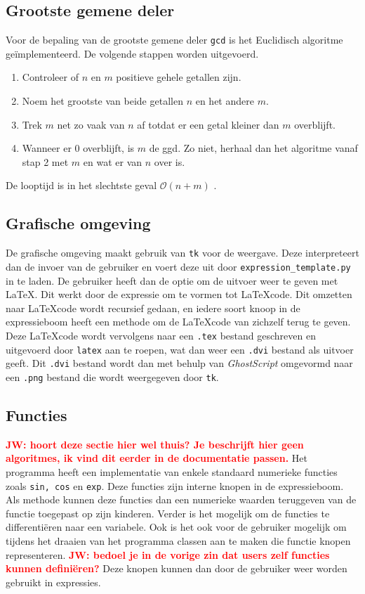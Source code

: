 \documentclass[a4paper]{article}
\newcommand{\rcom}[1]{\textbf{\textcolor{red}{#1}}}
\newcommand{\ttt}[1]{\texttt{#1}}
\begin{document}
\subsection{Grootste gemene deler}
Voor de bepaling van de grootste gemene deler \ttt{gcd} is het Euclidisch algoritme ge\"implementeerd. De volgende stappen worden uitgevoerd.
\begin{enumerate}
\item Controleer of $n$ en $m$ positieve gehele getallen zijn.
\item Noem het grootste van beide getallen $n$ en het andere $m$.
\item Trek $m$ net zo vaak van $n$ af totdat er een getal kleiner dan $m$ overblijft.
\item Wanneer er $0$ overblijft, is $m$ de ggd. Zo niet, herhaal dan het algoritme vanaf stap 2 met $m$ en wat er van $n$ over is.
\end{enumerate}
De looptijd is in het slechtste geval $\mathcal{O}(n+m)$ \cite{gcd}.

\subsection{Grafische omgeving}
De grafische omgeving maakt gebruik van  \ttt{tk} voor de weergave. Deze interpreteert dan de invoer van de gebruiker en voert deze uit door \ttt{expression\_template.py} in te laden. De gebruiker heeft dan de optie om de uitvoer weer te geven met \LaTeX. Dit werkt door de expressie om te vormen tot \LaTeX code. Dit omzetten naar \LaTeX code wordt recursief gedaan, en iedere soort knoop in de expressieboom heeft een methode om de \LaTeX code van zichzelf terug te geven. Deze \LaTeX code wordt vervolgens naar een \ttt{.tex} bestand geschreven en uitgevoerd door \ttt{latex} aan te roepen, wat dan weer een \ttt{.dvi} bestand als uitvoer geeft. Dit \ttt{.dvi} bestand wordt dan met behulp van \textit{GhostScript} omgevormd naar een \ttt{.png} bestand die wordt weergegeven door \ttt{tk}. 

\subsection{Functies}\rcom{JW: hoort deze sectie hier wel thuis? Je beschrijft hier geen algoritmes, ik vind dit eerder in de documentatie passen.}
Het programma heeft een implementatie van enkele standaard numerieke functies zoals \ttt{sin, cos} en \ttt{exp}. Deze functies zijn interne knopen in de expressieboom. Als methode kunnen deze functies dan een numerieke waarden teruggeven van de functie toegepast op zijn kinderen. Verder is het mogelijk om de functies te differenti\"eren naar een variabele. Ook is het ook voor de gebruiker mogelijk om tijdens het draaien van het programma classen aan te maken die functie knopen representeren. \rcom{JW: bedoel je in de vorige zin dat users zelf functies kunnen defini\"eren?} Deze knopen kunnen dan door de gebruiker weer worden gebruikt in expressies.  
\end{document}
